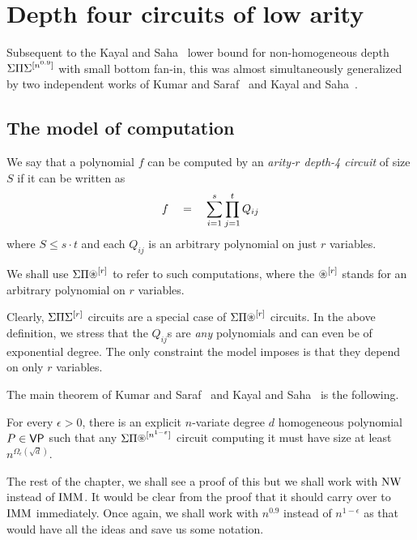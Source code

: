 \chapter{Depth four circuits of low arity}

Subsequent to the Kayal and Saha~\cite{KayalSaha14} lower bound for non-homogeneous depth $\Sigma\Pi\Sigma^{[n^{0.9}]}$ with small bottom fan-in, this was almost simultaneously generalized by two independent works of Kumar and Saraf~\cite{KumarSaraf15} and Kayal and Saha~\cite{KayalSaha15}.

\section{The model of computation}

\begin{definition} We say that a polynomial $f$ can be computed by an \emph{arity-$r$ depth-4 circuit} of size $S$ if it can be written as
\[
f \quad = \quad \sum_{i=1}^s \prod_{j=1}^t Q_{ij}
\]
where $S \leq s \cdot t$ and each $Q_{ij}$ is an arbitrary polynomial on just $r$ variables. 

We shall use $\SPA^{[r]}$ to refer to such computations, where the $\circast^{[r]}$ stands for an arbitrary polynomial on $r$ variables. 
\end{definition}

Clearly, $\Sigma\Pi\Sigma^{[r]}$ circuits are a special case of $\SPA^{[r]}$ circuits. In the above definition, we stress that the $Q_{ij}$s are \emph{any} polynomials and can even be of exponential degree. The only constraint the model imposes is that they depend on only $r$ variables. 

The main theorem of Kumar and Saraf~\cite{KumarSaraf15} and Kayal and Saha~\cite{KayalSaha15} is the following.

\begin{theorem}\label{thm:low-arity-lb} For every $\epsilon > 0$, there is an explicit $n$-variate degree $d$ homogeneous polynomial $P \in \mathsf{VP}$ such that any $\SPA^{[n^{1-\epsilon}]}$ circuit computing it must have size at least $n^{\Omega_\epsilon(\sqrt{d})}$. 
\end{theorem}

The rest of the chapter, we shall see a proof of this but we shall work with $\operatorname{\mathrm{NW}}$ instead of $\operatorname{\mathrm{IMM}}$. It would be clear from the proof that it should carry over to $\operatorname{\mathrm{IMM}}$ immediately. Once again, we shall work with $n^{0.9}$ instead of $n^{1-\epsilon}$ as that would have all the ideas and save us some notation. 


